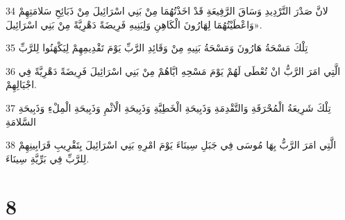 \par 34 لانَّ صَدْرَ التَّرْدِيدِ وَسَاقَ الرَّفِيعَةِ قَدْ اخَذْتُهُمَا مِنْ بَنِي اسْرَائِيلَ مِنْ ذَبَائِحِ سَلامَتِهِمْ وَاعْطَيْتُهُمَا لِهَارُونَ الْكَاهِنِ وَلِبَنِيهِ فَرِيضَةً دَهْرِيَّةً مِنْ بَنِي اسْرَائِيلَ».
\par 35 تِلْكَ مَسْحَةُ هَارُونَ وَمَسْحَةُ بَنِيهِ مِنْ وَقَائِدِ الرَّبِّ يَوْمَ تَقْدِيمِهِمْ لِيَكْهَنُوا لِلرَّبِّ
\par 36 الَّتِي امَرَ الرَّبُّ انْ تُعْطَى لَهُمْ يَوْمَ مَسْحِهِ ايَّاهُمْ مِنْ بَنِي اسْرَائِيلَ فَرِيضَةً دَهْرِيَّةً فِي اجْيَالِهِمْ.
\par 37 تِلْكَ شَرِيعَةُ الْمُحْرَقَةِ وَالتَّقْدِمَةِ وَذَبِيحَةِ الْخَطِيَّةِ وَذَبِيحَةِ الْاثْمِ وَذَبِيحَةِ الْمِلْءِ وَذَبِيحَةِ السَّلامَةِ
\par 38 الَّتِي امَرَ الرَّبُّ بِهَا مُوسَى فِي جَبَلِ سِينَاءَ يَوْمَ امْرِهِ بَنِي اسْرَائِيلَ بِتَقْرِيبِ قَرَابِينِهِمْ لِلرَّبِّ فِي بَرِّيَّةِ سِينَاءَ.

\chapter{8}

